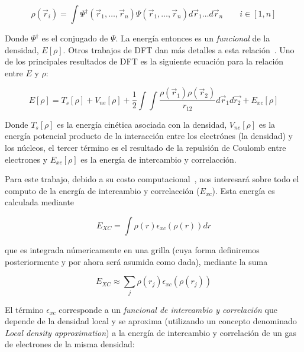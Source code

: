 \begin{equation}
    \label{honenberg_kohn}
    \rho(\vec{r}_i) = \int \Psi^{\dagger}(\vec{r}_1, \dots, \vec{r}_n) \Psi(\vec{r}_1, \dots, \vec{r}_n) d\vec{r}_1 \dots d\vec{r}_n \qquad i \in [1,n]
\end{equation}

Donde $\Psi^{\dagger}$ es el conjugado de $\Psi$. La energ\'ia entonces es un \textit{funcional} de la densidad, $E[\rho]$. Otros trabajos de DFT dan m\'as
detalles a esta relaci\'on~\cite{HohenbergKohn}. Uno de los principales resultados de DFT es la siguiente ecuaci\'on para la relaci\'on entre $E$ y $\rho$:

\begin{equation}
    \label{honenberg_kohn} 
    E[\rho] = T_s[\rho] + V_{ne}[\rho] + \frac{1}{2} \int \int \frac{\rho(\vec{r}_1) \rho(\vec{r}_2)}{r_{12}} d\vec{r}_1 d\vec{r_2} + E_{xc}[\rho]
\end{equation}

Donde $T_s[\rho]$ es la energ\'ia cin\'etica asociada con la densidad, $V_{ne}[\rho]$ es la energ\'ia potencial producto de la interacci\'on entre los
electr\'ones (la densidad) y los n\'ucleos, el tercer t\'ermino es el resultado de la repulsi\'on de Coulomb entre electrones y $E_{xc}[\rho]$ es la
energ\'ia de intercambio y correlacci\'on.

Para este trabajo, debido a su costo computacional~\cite{PaperNitscheManu}, nos interesar\'a sobre todo el computo de la energ\'ia de intercambio y correlacci\'on ($E_{xc}$).
Esta energ\'ia es calculada mediante 

\begin{equation}
    E_{XC} = \int \rho(r) \epsilon_{xc}\left( \rho(r) \right ) dr
\end{equation}

que es integrada n\'umericamente en una grilla (cuya forma definiremos posteriormente y por ahora ser\'a asumida como dada), mediante la suma

\begin{equation}
    \label{approx_excenergy}
    E_{XC} \approx \sum_j \rho(r_j) \epsilon_{xc} (\rho(r_j))
\end{equation}

El t\'ermino $\epsilon_{xc}$ corresponde a un \textit{funcional de intercambio y correlaci\'on} que depende de la densidad local y
se aproxima (utilizando un concepto denominado \textit{Local density approximation}) a la energ\'ia de intercambio y correlaci\'on de 
un gas de electrones de la misma densidad:

